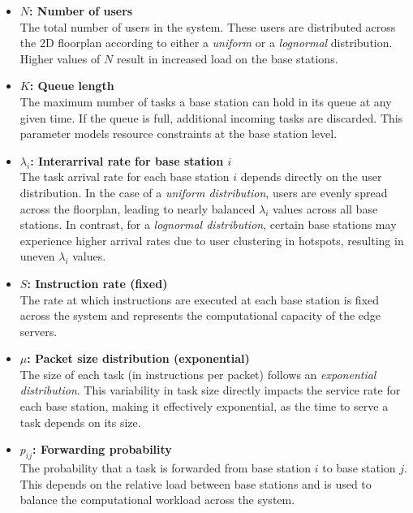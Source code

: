 \documentclass{report}
\begin{document}
\begin{itemize}
    \item \textbf{$N$: Number of users} \\
    The total number of users in the system. These users are distributed across the 2D floorplan according to either a \textit{uniform} or a \textit{lognormal} distribution. Higher values of $N$ result in increased load on the base stations.

    \item \textbf{$K$: Queue length} \\
    The maximum number of tasks a base station can hold in its queue at any given time. If the queue is full, additional incoming tasks are discarded. This parameter models resource constraints at the base station level.

    \item \textbf{$\lambda_i$: Interarrival rate for base station $i$} \\
    The task arrival rate for each base station $i$ depends directly on the user distribution. In the case of a \textit{uniform distribution}, users are evenly spread across the floorplan, leading to nearly balanced $\lambda_i$ values across all base stations. In contrast, for a \textit{lognormal distribution}, certain base stations may experience higher arrival rates due to user clustering in hotspots, resulting in uneven $\lambda_i$ values.

    \item \textbf{$S$: Instruction rate (fixed)} \\
    The rate at which instructions are executed at each base station is fixed across the system and represents the computational capacity of the edge servers.

    \item \textbf{$\mu$: Packet size distribution (exponential)} \\
    The size of each task (in instructions per packet) follows an \textit{exponential distribution}. This variability in task size directly impacts the service rate for each base station, making it effectively exponential, as the time to serve a task depends on its size.

    \item \textbf{$p_{ij}$: Forwarding probability} \\
    The probability that a task is forwarded from base station $i$ to base station $j$. This depends on the relative load between base stations and is used to balance the computational workload across the system.


\end{itemize}
\end{document}

